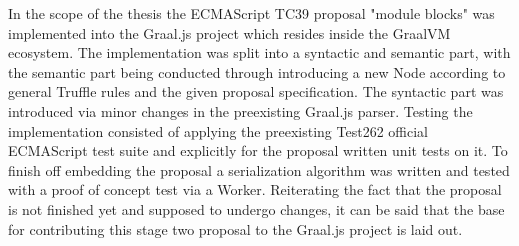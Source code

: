 In the scope of the thesis the ECMAScript TC39 proposal "module blocks" was implemented into the Graal.js project which resides inside the GraalVM ecosystem. The implementation was split into a syntactic and semantic part, with the semantic part being conducted through introducing a new Node according to general Truffle rules and the given proposal specification. The syntactic part was introduced via minor changes in the preexisting Graal.js parser. Testing the implementation consisted of applying the preexisting Test262 official ECMAScript test suite and explicitly for the proposal written unit tests on it. To finish off embedding the proposal a serialization algorithm was written and tested with a proof of concept test via a Worker. Reiterating the fact that the proposal is not finished yet and supposed to undergo changes, it can be said that the base for contributing this stage two proposal to the Graal.js project is laid out.